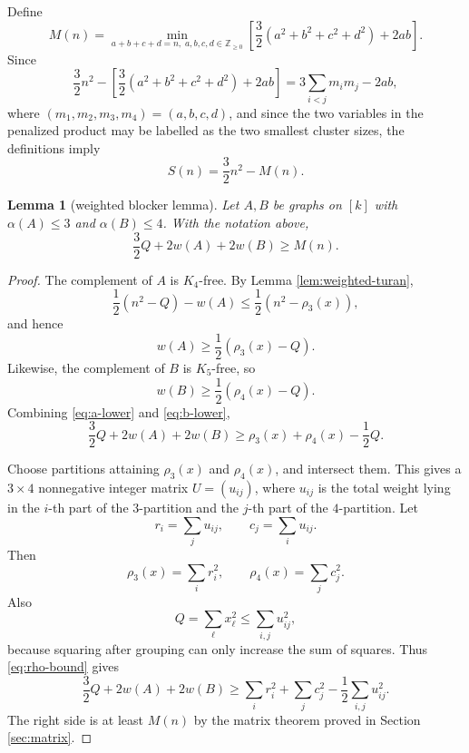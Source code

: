 \documentclass[12pt]{article}
\theoremstyle{plain}
\newtheorem{lemma}[theorem]{Lemma}
\theoremstyle{definition}
\theoremstyle{remark}
\begin{document}
Define
\begin{equation}\label{eq:Mdef}
  M(n)=\min_{a+b+c+d=n,\;a,b,c,d\in\mathbb Z_{\ge0}}
  \left[\frac32(a^2+b^2+c^2+d^2)+2ab\right].
\end{equation}
Since
\[
  \frac32n^2-
  \left[\frac32(a^2+b^2+c^2+d^2)+2ab\right]
  =3\sum_{i<j}m_i m_j-2ab,
\]
where \((m_1,m_2,m_3,m_4)=(a,b,c,d)\), and since the two variables in the
penalized product may be labelled as the two smallest cluster sizes, the
definitions imply
\begin{equation}\label{eq:S-M}
  S(n)=\frac32 n^2-M(n).
\end{equation}

\begin{lemma}[weighted blocker lemma]\label{lem:blocker}
Let \(A,B\) be graphs on \([k]\) with \(\alpha(A)\le3\) and
\(\alpha(B)\le4\).  With the notation above,
\begin{equation}\label{eq:blocker}
  \frac32Q+2w(A)+2w(B)\ge M(n).
\end{equation}
\end{lemma}

\begin{proof}
The complement of \(A\) is \(K_4\)-free.  By Lemma \ref{lem:weighted-turan},
\[
  \frac12(n^2-Q)-w(A)
  \le \frac12(n^2-\rho_3(x)),
\]
and hence
\begin{equation}\label{eq:a-lower}
  w(A)\ge\frac12(\rho_3(x)-Q).
\end{equation}
Likewise, the complement of \(B\) is \(K_5\)-free, so
\begin{equation}\label{eq:b-lower}
  w(B)\ge\frac12(\rho_4(x)-Q).
\end{equation}
Combining \eqref{eq:a-lower} and \eqref{eq:b-lower},
\begin{equation}\label{eq:rho-bound}
  \frac32Q+2w(A)+2w(B)
  \ge \rho_3(x)+\rho_4(x)-\frac12Q.
\end{equation}

Choose partitions attaining \(\rho_3(x)\) and \(\rho_4(x)\), and intersect
them.  This gives a \(3\times4\) nonnegative integer matrix
\(U=(u_{ij})\), where \(u_{ij}\) is the total weight lying in the \(i\)-th
part of the \(3\)-partition and the \(j\)-th part of the \(4\)-partition.
Let
\[
  r_i=\sum_j u_{ij},\qquad c_j=\sum_i u_{ij}.
\]
Then
\[
  \rho_3(x)=\sum_i r_i^2,
  \qquad
  \rho_4(x)=\sum_j c_j^2.
\]
Also
\[
  Q=\sum_\ell x_\ell^2\le \sum_{i,j}u_{ij}^2,
\]
because squaring after grouping can only increase the sum of squares.  Thus
\eqref{eq:rho-bound} gives
\[
  \frac32Q+2w(A)+2w(B)
  \ge
  \sum_i r_i^2+
  \sum_j c_j^2-\frac12\sum_{i,j}u_{ij}^2.
\]
The right side is at least \(M(n)\) by the matrix theorem proved in
Section \ref{sec:matrix}.
\end{proof}
\end{document}
